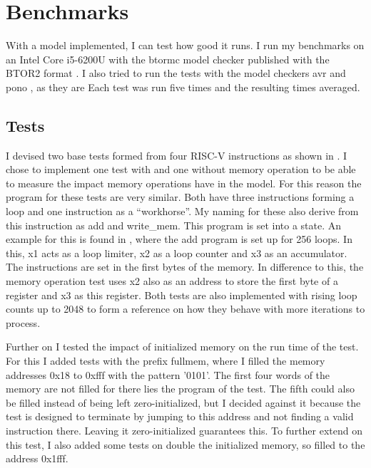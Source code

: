 \chapter{Benchmarks}\label{chap:benchmarks}
With a model implemented, I can test how good it runs. I run my
benchmarks on an Intel Core i5-6200U with the btormc model checker
published with the BTOR2 format \cite{btor2}. I also tried to run the
tests with the model checkers avr and pono , as they are
Each test was run five times and the resulting times averaged.

\section{Tests}
I devised two base tests formed from four RISC-V instructions as
shown in . I chose to implement one test
with and one without memory operation to be able to measure the
impact memory operations have in the model. For this reason the
program for these tests are very similar. Both have three
instructions forming a loop and one instruction as a
\enquote{workhorse}. My naming for these also derive from this
instruction as add and write\_mem. This program is set into a state.
An example for this is found in , where the
add program is set up for 256 loops. In this, x1 acts as a loop
limiter, x2 as a loop counter and x3 as an accumulator. The
instructions are set in the first bytes of the memory. In difference
to this, the memory operation test uses x2 also as an address to
store the first byte of a register and x3 as this register. Both
tests are also implemented with rising loop counts up to 2048 to form
a reference on how they behave with more iterations to process.




Further on I tested the impact of initialized memory on the run time
of the test. For this I added tests with the prefix fullmem, where I
filled the memory addresses 0x18 to 0xfff with the pattern '0101'.
The first four words of the memory are not filled for there lies the
program of the test. The fifth could also be filled instead of being
left zero-initialized, but I decided against it because the test is
designed to terminate by jumping to this address and not finding a
valid instruction there. Leaving it zero-initialized guarantees this.
To further extend on this test, I also added some tests on double the
initialized memory, so filled to the address 0x1fff.

